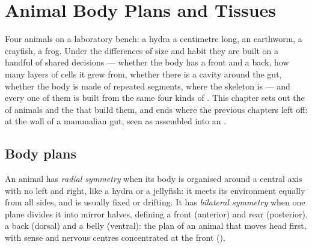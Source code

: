 \chapter{Animal Body Plans and Tissues}\label{ch:b1:body-plans-tissues}

Four animals on a laboratory bench: a hydra a centimetre long, an
earthworm, a crayfish, a frog. Under the differences of size and habit
they are built on a handful of shared decisions --- whether the body has
a front and a back, how many layers of cells it grew from, whether there
is a cavity around the gut, whether the body is made of repeated
segments, where the skeleton is --- and every one of them is built from
the same four kinds of . This chapter sets out the  of
animals and the  that build them, and ends where the previous
chapters left off: at the wall of a mammalian gut, seen as 
assembled into an .

\section{Body plans}

\begin{definition}\label{def:b1:body-plans-tissues:symmetry}
An animal has \emph{radial symmetry} when its
body is organised around a central axis with no left and right, like a
hydra or a jellyfish: it meets its environment equally from all sides,
and is usually fixed or drifting. It has \emph{bilateral
symmetry} when one plane divides it into
mirror halves, defining a front (anterior) and rear (posterior), a back
(dorsal) and a belly (ventral): the plan of an animal that moves head
first, with sense  and nervous centres concentrated at the front
().
\end{definition}

